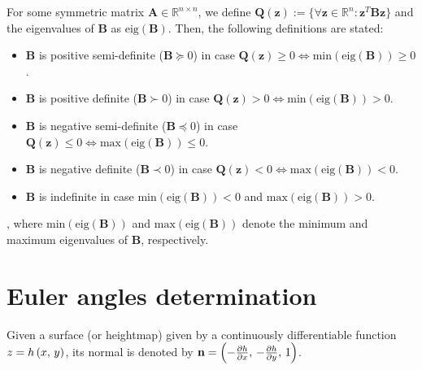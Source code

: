 \begin{definition}
For some symmetric matrix $\mathbf{A} \in \mathbb{R}^{n \times n}$, we define $\mathbf{Q}(\mathbf{z}) := \{ \forall \mathbf{z} \in \mathbb{R}^n: \mathbf{z}^T \mathbf{B} \mathbf{z} \}$ and the eigenvalues of $\mathbf{B}$ as $\text{eig}(\mathbf{B})$. Then, the following definitions are stated:

\begin{itemize}
\item $\mathbf{B}$ is positive semi-definite ($\mathbf{B} \succeq 0$) in case $\mathbf{Q}(\mathbf{z}) \geq 0 \Leftrightarrow \text{min}\left( \text{eig}(\mathbf{B}) \right) \geq 0$.\\
\item $\mathbf{B}$ is positive definite ($\mathbf{B} \succ 0$) in case $\mathbf{Q}(\mathbf{z}) > 0 \Leftrightarrow \text{min}\left( \text{eig}(\mathbf{B}) \right) > 0$.\\
\item $\mathbf{B}$ is negative semi-definite ($\mathbf{B} \preceq 0$) in case $\mathbf{Q}(\mathbf{z}) \leq 0 \Leftrightarrow \text{max}\left( \text{eig}(\mathbf{B}) \right) \leq 0$.\\
\item $\mathbf{B}$ is negative definite ($\mathbf{B} \prec 0$) in case $\mathbf{Q}(\mathbf{z}) < 0 \Leftrightarrow \text{max}\left( \text{eig}(\mathbf{B}) \right) < 0$.\\
\item $\mathbf{B}$ is indefinite in case $\text{min}\left( \text{eig}(\mathbf{B}) \right) < 0$ and $\text{max}\left( \text{eig}(\mathbf{B}) \right) > 0$.
\end{itemize}

\noindent, where $\text{min}\left( \text{eig}(\mathbf{B}) \right)$ and $\text{max}\left( \text{eig}(\mathbf{B}) \right)$ denote the minimum and maximum eigenvalues of $\mathbf{B}$, respectively.
\label{def:matrixeigenvalues}
\end{definition}

\section{Euler angles determination}
\label{section:eulerAnglesDetermination}

Given a surface (or heightmap) given by a continuously differentiable function $z = h\left(x,\,y\right)$, its normal is denoted by $\mathbf{n} = \left(-\pdv{h}{x},\, -\pdv{h}{y},\,1\right)$.

